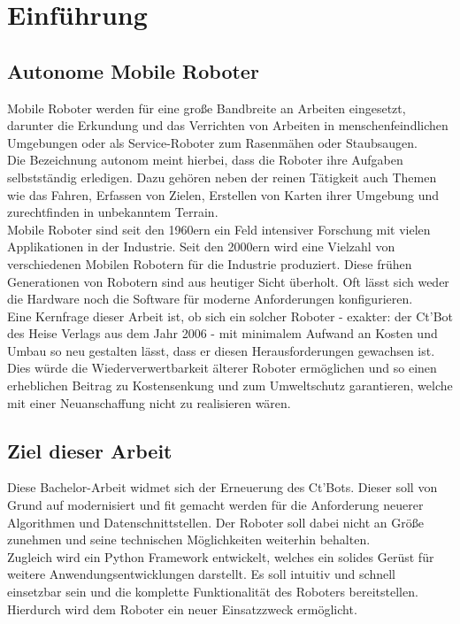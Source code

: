 \documentclass[twoside,11pt, a4paper]{report}
\begin{document}
	\chapter{Einführung}
	
	\section{Autonome Mobile Roboter}
	Mobile Roboter werden für eine große Bandbreite an Arbeiten eingesetzt, darunter die Erkundung und das Verrichten von Arbeiten in menschenfeindlichen Umgebungen oder als Service-Roboter zum Rasenmähen oder Staubsaugen.\\
	Die Bezeichnung autonom meint hierbei, dass die Roboter ihre Aufgaben selbstständig erledigen. Dazu gehören neben der reinen Tätigkeit auch Themen wie das Fahren, Erfassen von Zielen, Erstellen von Karten ihrer Umgebung und zurechtfinden in unbekanntem Terrain. \\
	Mobile Roboter sind seit den 1960ern ein Feld intensiver Forschung mit vielen Applikationen in der Industrie. Seit den 2000ern wird eine Vielzahl von verschiedenen Mobilen Robotern für die Industrie produziert. Diese frühen Generationen von Robotern sind aus heutiger Sicht überholt. Oft lässt sich weder die Hardware noch die Software für moderne Anforderungen konfigurieren.\\
	Eine Kernfrage dieser Arbeit ist, ob sich ein solcher Roboter - exakter: der Ct'Bot des Heise Verlags aus dem Jahr 2006 - mit minimalem Aufwand an Kosten und Umbau so neu gestalten lässt, dass er diesen Herausforderungen gewachsen ist. \\
	Dies würde die Wiederverwertbarkeit älterer Roboter ermöglichen und so einen erheblichen Beitrag zu Kostensenkung und zum Umweltschutz garantieren, welche mit einer Neuanschaffung nicht zu realisieren wären. 
	
	\section{Ziel dieser Arbeit}
	Diese Bachelor-Arbeit widmet sich der Erneuerung des Ct'Bots. Dieser soll von Grund auf modernisiert und fit gemacht werden für die Anforderung neuerer Algorithmen und Datenschnittstellen. Der Roboter soll dabei nicht an Größe zunehmen und seine technischen Möglichkeiten weiterhin behalten. \\
	
	Zugleich wird ein Python Framework entwickelt, welches ein solides Gerüst für weitere Anwendungsentwicklungen darstellt. Es soll intuitiv und schnell einsetzbar sein und die komplette Funktionalität des Roboters bereitstellen. Hierdurch wird dem Roboter ein neuer Einsatzzweck ermöglicht. \\
	
\end{document}

